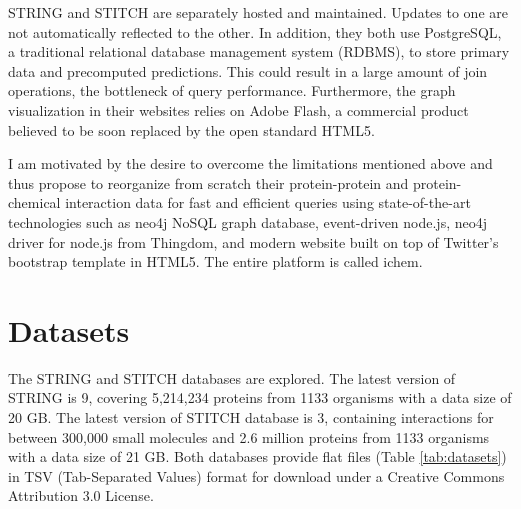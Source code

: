 \documentclass[10pt,conference,compsocconf]{../IEEEtran}
\begin{document}
STRING and STITCH are separately hosted and maintained. Updates to one are not automatically reflected to the other. In addition, they both use PostgreSQL, a traditional relational database management system (RDBMS), to store primary data and precomputed predictions. This could result in a large amount of join operations, the bottleneck of query performance. Furthermore, the graph visualization in their websites relies on Adobe Flash, a commercial product believed to be soon replaced by the open standard HTML5.

I am motivated by the desire to overcome the limitations mentioned above and thus propose to reorganize from scratch their protein-protein and protein-chemical interaction data for fast and efficient queries using state-of-the-art technologies such as neo4j NoSQL graph database, event-driven node.js, neo4j driver for node.js from Thingdom, and modern website built on top of Twitter's bootstrap template in HTML5. The entire platform is called ichem.

\section{Datasets}

The STRING and STITCH databases are explored. The latest version of STRING is 9, covering 5,214,234 proteins from 1133 organisms with a data size of 20 GB. The latest version of STITCH database is 3, containing interactions for between 300,000 small molecules and 2.6 million proteins from 1133 organisms with a data size of 21 GB. Both databases provide flat files (Table \ref{tab:datasets}) in TSV (Tab-Separated Values) format for download under a Creative Commons Attribution 3.0 License.
\end{document}
